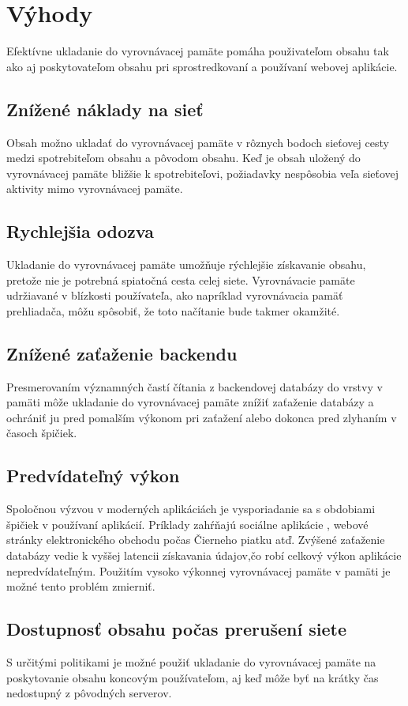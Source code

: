 \documentclass[10pt,oneside,slovak,a4paper]{article}
\begin{document}
\section{Výhody}
\quad Efektívne ukladanie do vyrovnávacej pamäte pomáha použivateľom obsahu tak ako aj poskytovateľom obsahu pri sprostredkovaní a používaní webovej aplikácie.
\subsection{Znížené náklady na sieť}
\quad
Obsah možno ukladať do vyrovnávacej pamäte v rôznych bodoch sieťovej cesty medzi spotrebiteľom obsahu a pôvodom obsahu.\cite{OCEAN} Keď je obsah uložený do vyrovnávacej pamäte bližšie k spotrebiteľovi, požiadavky nespôsobia veľa sieťovej aktivity mimo vyrovnávacej pamäte.
\subsection{Rychlejšia odozva}
\quad
Ukladanie do vyrovnávacej pamäte umožňuje rýchlejšie získavanie obsahu, pretože nie je potrebná spiatočná cesta celej siete. Vyrovnávacie pamäte udržiavané v blízkosti používateľa, ako napríklad vyrovnávacia pamäť prehliadača, môžu spôsobiť, že toto načítanie bude takmer okamžité.


\subsection{Znížené zaťaženie backendu}
\quad Presmerovaním významných častí čítania z backendovej databázy do vrstvy v pamäti môže ukladanie do vyrovnávacej pamäte znížiť zaťaženie  \cite{OCEAN}databázy a ochrániť ju pred pomalším výkonom pri zaťažení alebo dokonca pred zlyhaním v časoch špičiek.

\subsection{Predvídateľný výkon}
\quad Spoločnou výzvou v moderných aplikáciách je vysporiadanie sa s obdobiami špičiek v používaní aplikácií. Príklady zahŕňajú sociálne aplikácie , webové stránky elektronického obchodu počas Čierneho piatku atď. Zvýšené zaťaženie databázy vedie k vyššej latencii získavania údajov,\cite{OCEAN}čo robí celkový výkon aplikácie nepredvídateľným. Použitím vysoko výkonnej vyrovnávacej pamäte v pamäti je možné tento problém zmierniť.

\subsection{Dostupnosť obsahu počas prerušení siete}
\quad
S určitými politikami je možné použiť ukladanie do vyrovnávacej pamäte na poskytovanie obsahu koncovým používateľom, aj keď môže byť na krátky čas nedostupný z pôvodných serverov.
\end{document}
